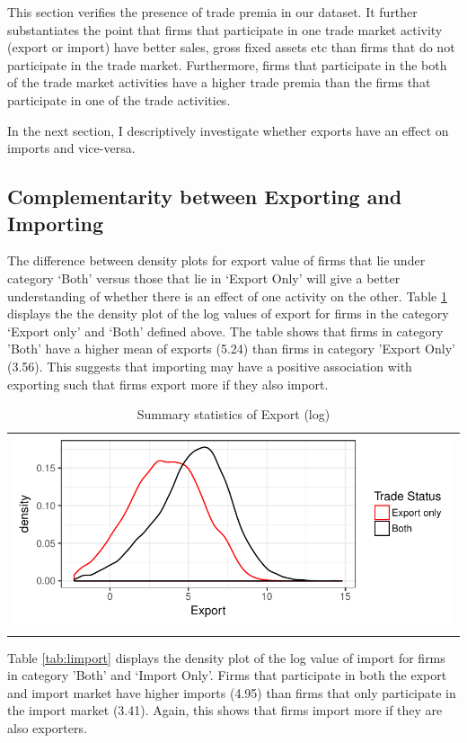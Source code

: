 \documentclass[12pt]{article}
\begin{document}
This section verifies the presence of trade premia in our
dataset. It further substantiates the point that firms that
participate in one trade market activity (export or import) have
better sales, gross fixed assets etc than firms that do not
participate in the trade market. Furthermore, firms that participate
in the both of the trade market activities have a higher trade premia
than the firms that participate in one of the trade activities. 

In the next section, I descriptively investigate whether exports have an effect
on imports and vice-versa.  

\subsection{Complementarity between Exporting and Importing}
The difference between density plots for export value of firms that
lie under category `Both'  versus those that lie in `Export Only' will
give a better understanding of whether there is an effect of one activity on the other. 
Table \ref{tab:lexport} displays the the density plot  of the log
values of export for firms in the category `Export only' and `Both'
defined above. The table shows that firms in category 'Both'
 have a higher mean of exports (5.24) than firms in category 'Export
 Only' (3.56). This suggests that importing may have a
positive association with exporting such that firms export more if
they also import.

\begin{center}
\begin{table}[H]
\caption{Summary statistics of Export (log)}
\label{tab:lexport}
\begin{tabular}{c}
 \includegraphics{./PICS/denslexport.pdf}   \\ 
   \\  
\end{tabular}
\end{table}
\end{center}
Table \ref{tab:limport} displays the density plot of the log value of
import  for firms in category 'Both' and `Import Only'.
Firms that participate in both the
export and import market have higher imports (4.95) than firms that only
participate in the import market (3.41). Again, this shows that firms
import more if they are also exporters. 
\end{document}
